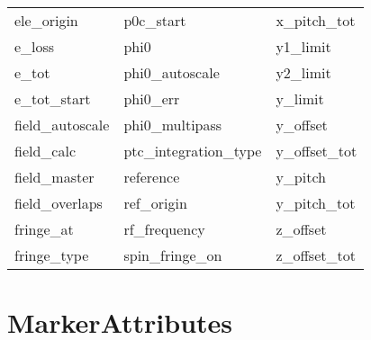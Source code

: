 \begin{tabular}{lll}
ele_origin                  & p0c_start                   & x_pitch_tot                 \\
e_loss                      & phi0                        & y1_limit                    \\
e_tot                       & phi0_autoscale              & y2_limit                    \\
e_tot_start                 & phi0_err                    & y_limit                     \\
field_autoscale             & phi0_multipass              & y_offset                    \\
field_calc                  & ptc_integration_type        & y_offset_tot                \\
field_master                & reference                   & y_pitch                     \\
field_overlaps              & ref_origin                  & y_pitch_tot                 \\
fringe_at                   & rf_frequency                & z_offset                    \\
fringe_type                 & spin_fringe_on              & z_offset_tot                \\
 \bottomrule
 \end{tabular}
 \vfill
 
 \section{MarkerAttributes}
 \label{s:list.marker}
 
